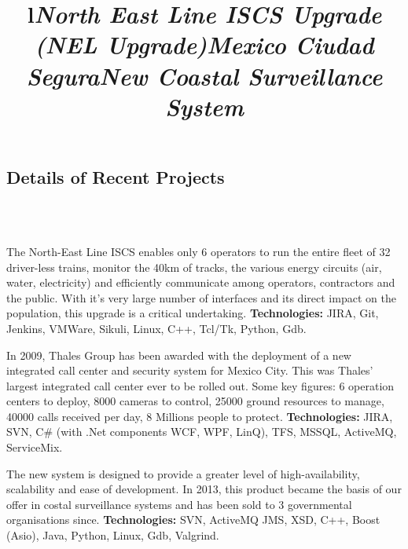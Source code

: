 \documentclass[overlapped,line,letterpaper]{res}
\begin{document}
\begin{resume}


  \section{\bf Details of Recent Projects}

  \begin{format}
    \title{l}\\
    \body\\
  \end{format}

  \title{\em North East Line ISCS Upgrade (NEL Upgrade)}
  \begin{position}
    The North-East Line ISCS enables only 6 operators to run the entire fleet of
    32 driver-less trains, monitor the 40km of tracks, the various energy
    circuits (air, water, electricity) and efficiently communicate among
    operators, contractors and the public. With it's very large number of
    interfaces and its direct impact on the population, this upgrade is a
    critical undertaking.
    \newline
    {\bf Technologies:} JIRA, Git, Jenkins, VMWare, Sikuli, Linux, C++, Tcl/Tk, Python, Gdb.
  \end{position}

  \title{\em Mexico Ciudad Segura}
  \begin{position}
    In 2009, Thales Group has been awarded with the deployment of a new
    integrated call center and security system for Mexico City.  This was
    Thales' largest integrated call center ever to be rolled out. Some key
    figures: 6 operation centers to deploy, 8000 cameras to control, 25000
    ground resources to manage, 40000 calls received per day, 8 Millions people
    to protect.
    \newline
    {\bf Technologies:} JIRA, SVN, C\# (with .Net components WCF, WPF, LinQ), TFS, MSSQL, ActiveMQ,
    ServiceMix.
  \end{position}

  \title{\em New Coastal Surveillance System}
  \begin{position}
    The new system is designed to provide a greater level of high-availability,
    scalability and ease of development. In 2013, this product became the basis
    of our offer in costal surveillance systems and has been sold to 3
    governmental organisations since.
    \newline
    {\bf Technologies:} SVN, ActiveMQ JMS, XSD, C++, Boost (Asio), Java, Python, Linux,
    Gdb, Valgrind.
  \end{position}


\end{resume}
\end{document}
